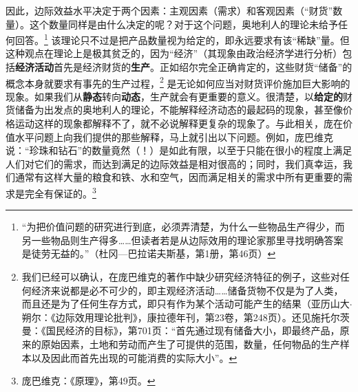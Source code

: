 \documentclass[fontset=fandol, a4paper, 12pt, openright]{ctexbook}
\begin{document}
因此，边际效益水平决定于两个因素：主观因素（需求）和客观因素（“财货”数量）。这个数量同样是由什么决定的呢？对于这个问题，奥地利人的理论未给予任何回答。\footnote{“为把价值问题的研究进行到底，必须弄清楚，为什么一些物品生产得少，而另一些物品则生产得多……但读者若是从边际效用的理论家那里寻找明确答案是徒劳无益的。”（杜冈—巴拉诺夫斯基，第1册，第46页）} 该理论只不过是把产品数量视为给定的，即永远要求有该“稀缺”量。但这种观点在理论上是极其贫乏的，因为“经济”（其现象由政治经济学进行分析）包括\textbf{经济活动}首先是经济财货的\textbf{生产}。正如绍尔完全正确肯定的，这些财货“储备”的概念本身就要求有事先的生产过程，\footnote{我们已经可以确认，在庞巴维克的著作中缺少研究经济特征的例子，这些对任何经济来说都是必不可少的，即主观经济活动……储备货物不仅是为了人类，而且还是为了任何生存方式，即只有作为某个活动可能产生的结果（亚历山大$\cdot$朔尔：《边际效用理论批判》，康拉德年刊，第23卷，第248页）。还见施托尔茨曼：《国民经济的目标》，第701页：“首先通过现有储备大小，即最终产品，原来的原始因素，土地和劳动而产生了可提供的范围，数量，任何物品的生产样本以及因此而首先出现的可能消费的实际大小”。} 是无论如何应当对财货评价施加巨大影响的现象。如果我们从\textbf{静态}转向\textbf{动态}，生产就会有更重要的意义。很清楚，以\textbf{给定的}财货储备为出发点的奥地利人的理论，不能解释经济动态的最起码的现象，甚至像价格运动这样的现象都解释不了，就不必说解释更复杂的现象了。与此相关，庞在价值水平问题上向我们提供的那些解释，马上就引出以下问题。例如，庞巴维克说：“珍珠和钻石”的数量竟然（！）是如此有限，以至于只能在很小的程度上满足人们对它们的需求，而达到满足的边际效益是相对很高的；同时，我们真幸运，我们通常有这样大量的粮食和铁、水和空气，因而满足相关的需求中所有更重要的需求是完全有保证的。\footnote{庞巴维克：《原理》，第49页。}
\end{document}
